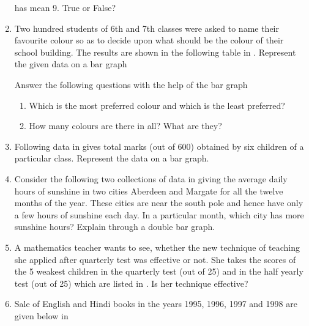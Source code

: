 \begin{enumerate}[label=\thesection.\arabic*, ref=\thesection.\theenumi,resume*]
has mean 9.  True or False?
\item Two hundred students of 6th and 7th classes were asked to name their favourite colour so as to decide upon what should be the colour of their school building. The results are shown in the following table
  in   .
	 Represent the given data on a bar graph
	\begin{table}[H]
  \centering
  
  \caption{}
  \label{tab:colour}
\end{table}
Answer the following questions with the help of the bar graph
	\begin{enumerate}
	\item Which is the most preferred colour and which is the least preferred? 
	\item How many colours are there in all? What are they?
	\end{enumerate}
\item Following data 
  in 
	gives total marks (out of 600) obtained by six children of a particular class. Represent the data on a bar graph.
	\begin{table}[H]
  \centering
  
  \caption{}
  \label{tab:marks}
\end{table}
\item Consider the following two collections of data 
in
	giving the average daily hours of sunshine in two cities Aberdeen and Margate for all the twelve months of the year. These cities are near the south pole and hence have only a few hours of sunshine each day.
	In a particular month, which city has more sunshine hours?  Explain through a double bar graph.
	\begin{table}[H]
  \centering
  
  \caption{}
  \label{tab:hours}
\end{table}
\item A mathematics teacher wants to see, whether the new technique of teaching she applied after quarterly test was effective or not. She takes the scores of the 5 weakest children in the quarterly test (out of 25) and in the half yearly test (out of 25) which are listed in 
  .  Is her technique effective?
	\begin{table}[H]
  \centering
  
  \caption{}
  \label{tab:students}
\end{table}
\item	Sale of English and Hindi books in the years 1995, 1996, 1997 and 1998 are given below in

\end{enumerate}
